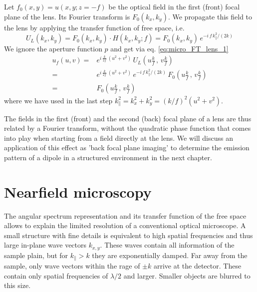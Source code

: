 Let $f_0(x,y) = u(x,y; z = -f)$ be the optical field in the first (front) focal plane of the lens. Its Fourier transform is $F_0(k_x, k_y)$. We propagate this field to the lens by applying the transfer function of free space, i.e.
\begin{equation}
U_L(k_x, k_y) = F_0(k_x, k_y) \cdot H(k_x, k_y; f) = F_0(k_x, k_y) \, e^{-i \,  f \, k_\parallel^2 / (2 k)}
\end{equation}
We ignore the aperture function $p$ and get via eq. \ref{eq:micro_FT_lens_1} 
\begin{align}
    u_f(u,v)  = & e^{i \, \frac{k}{2f} \, ( u^2 + v^2) } \, U_{L} \left(u \frac{k}{f} \,  , \,  v \frac{k}{f} \right) \\
    = & e^{i \, \frac{k}{2f} \, ( u^2 + v^2) }   \, e^{-i \,  f \, k_\parallel^2 / (2 k)}
    \, F_{0} \left(u \frac{k}{f} \,  , \,  v \frac{k}{f} \right)  \\
    = &  F_{0} \left(u \frac{k}{f} \,  , \,  v \frac{k}{f} \right)  
\end{align}
where we have used in the last step $k_\parallel^2 = k_x^2 + k_y^2 = (k/f)^2 (u^2 + v^2)$. 

The fields in the first (front) and the second (back) focal plane of a lens are thus related by a Fourier transform, without the quadratic phase function that comes into play when starting from a field directly at the lens. We will discuss an application of this effect as 'back focal plane imaging' to determine the emission pattern of a dipole in a structured environment in the next chapter.




\section{Nearfield microscopy}


The angular spectrum representation and its transfer function of the free space allows to explain the limited resolution of a conventional optical microscope. A small structure with fine details is equivalent to high spatial frequencies and thus large in-plane wave vectors $k_{x,y}$. These waves contain all information of the sample plain, but for $k_\parallel > k$ they are exponentially damped. Far away from the sample, only wave vectors within the rage of $\pm k$ arrive at the detector. These contain only spatial frequencies of $\lambda/2$ and larger. Smaller objects are blurred to this size.

